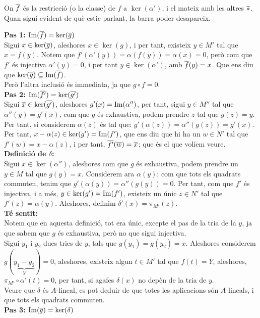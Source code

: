 \documentclass[11pt, a4paper]{article}
\begin{document}
On $\overline f$ és la restricció (o la classe) de $f$ a $\ker(\alpha')$, i el mateix amb les altres $\overline*$. Quan sigui evident de què estic parlant, la barra poder desapareix.\par
\textbf{Pas 1: $\operatorname{Im}(\overline{f})=\ker(\overline{g})$}\\
Sigui $x\in \ker(\overline{g})$, aleshores $x\in \ker(g)$, i per tant, existeix $y\in M'$ tal que $x = f(y)$. Notem que $f'(\alpha'(y))=\alpha(f(y))=\alpha(x)=0$, però com que $f'$ és injectiva $\alpha'(y)=0$, i per tant $y\in \ker(\alpha')$, amb $\overline f(y)=x$. Que ens diu que $\ker(\overline{g})\subseteq \operatorname{Im}(\overline f)$.\\
Però l'altra inclusió és immediata, ja que $g\circ f=0$.\\[5mm]
\textbf{Pas 2: $\operatorname{Im}(\overline{f'})=\ker(\overline{g'})$}\\
Sigui $\overline x\in \ker(\overline{g'})$, aleshores $g'(x)=\operatorname{Im} (\alpha'')$, per tant, sigui $y\in M''$ tal que $\alpha''(y)=g'(x)$, com que $g$ és exhaustiva, podem prendre $z$ tal que $g(z)=y$. Per tant, si considerem $\alpha(z)$ és tal que: $g'(\alpha(z))=\alpha''(g(z))=g'(x)$. Per tant, $x-\alpha(z)\in \ker(g')=\operatorname{Im}(f')$, que ens diu que hi ha un $w\in N'$ tal que $f'(w)=x-\alpha(z)$, i per tant, $\overline{f'}(\overline{w})=\overline x$; que és el que volíem veure.\\[5mm]
\textbf{Definició de $\delta$:}\\
Sigui $x\in \ker(\alpha'')$, aleshores com que $g$ és exhaustiva, podem prendre un $y\in M$ tal que $g(y)=x$. Considerem ara $\alpha(y)$; com que tots els quadrats commuten, tenim que $g'(\alpha(y))=\alpha''(g(y))=0$. Per tant, com que $f'$ és injectiva, i a més, $y\in \ker(g')=\operatorname{Im}(f')$, existeix un únic $z\in N'$ tal que $f'(z)=\alpha(y)$. Aleshores, definim $\delta'(x)=\pi_{M'}(z)$.\\[3mm]
\textbf{Té sentit:}\\
Notem que en aquesta definició, tot era únic, excepte el pas de la tria de la $y$, ja que sabem que $g$ és exhaustiva, però no que sigui injectiva.\\
Sigui $y_1$ i $y_2$ dues tries de $y$, tals que $g(y_1)=g(y_2)=x$. Aleshores considerem $g(\underbrace{y_1-y_2}_{Y})=0$, aleshores, existeix algun $t\in M'$ tal que $f(t)=Y$, aleshores, $\pi_{M'}\circ\alpha'(t)=0$, per tant, si agafes $\delta(x)$ no depèn de la tria de $y$.\\
Veure que $\delta$ és $A$-lineal, es pot deduir de que totes les aplicacions són $A$-lineals, i que tots els quadrats commuten.\\[5mm]
\textbf{Pas 3: $\operatorname{Im} (\overline g)=\ker(\delta)$}\\
\end{document}
